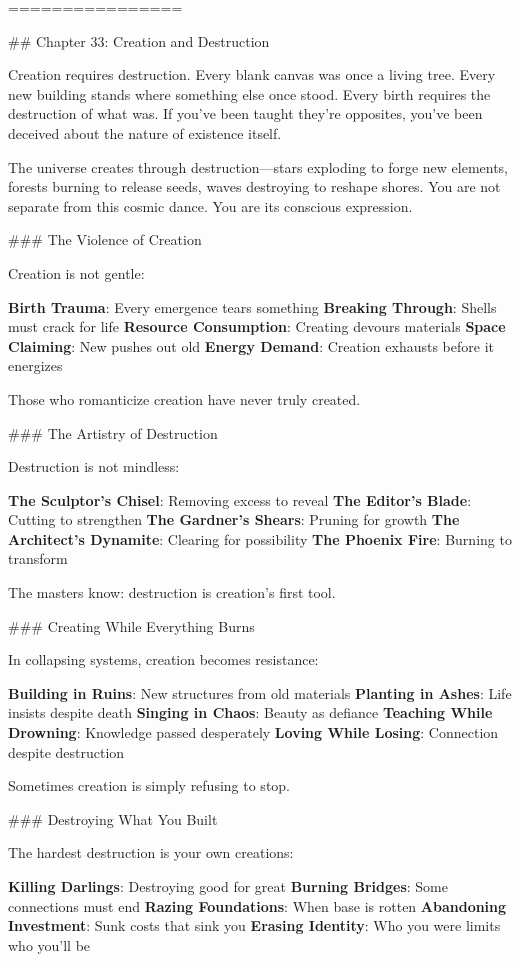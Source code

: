 \documentclass[12pt]{book}
\begin{document}
================

\#\# Chapter 33: Creation and Destruction

Creation requires destruction. Every blank canvas was once a living tree. Every new building stands where something else once stood. Every birth requires the destruction of what was. If you've been taught they're opposites, you've been deceived about the nature of existence itself.

The universe creates through destruction—stars exploding to forge new elements, forests burning to release seeds, waves destroying to reshape shores. You are not separate from this cosmic dance. You are its conscious expression.

\#\#\# The Violence of Creation

Creation is not gentle:

\textbf{Birth Trauma}: Every emergence tears something
\textbf{Breaking Through}: Shells must crack for life
\textbf{Resource Consumption}: Creating devours materials
\textbf{Space Claiming}: New pushes out old
\textbf{Energy Demand}: Creation exhausts before it energizes

Those who romanticize creation have never truly created.

\#\#\# The Artistry of Destruction

Destruction is not mindless:

\textbf{The Sculptor's Chisel}: Removing excess to reveal
\textbf{The Editor's Blade}: Cutting to strengthen
\textbf{The Gardner's Shears}: Pruning for growth
\textbf{The Architect's Dynamite}: Clearing for possibility
\textbf{The Phoenix Fire}: Burning to transform

The masters know: destruction is creation's first tool.

\#\#\# Creating While Everything Burns

In collapsing systems, creation becomes resistance:

\textbf{Building in Ruins}: New structures from old materials
\textbf{Planting in Ashes}: Life insists despite death
\textbf{Singing in Chaos}: Beauty as defiance
\textbf{Teaching While Drowning}: Knowledge passed desperately
\textbf{Loving While Losing}: Connection despite destruction

Sometimes creation is simply refusing to stop.

\#\#\# Destroying What You Built

The hardest destruction is your own creations:

\textbf{Killing Darlings}: Destroying good for great
\textbf{Burning Bridges}: Some connections must end
\textbf{Razing Foundations}: When base is rotten
\textbf{Abandoning Investment}: Sunk costs that sink you
\textbf{Erasing Identity}: Who you were limits who you'll be
\end{document}
